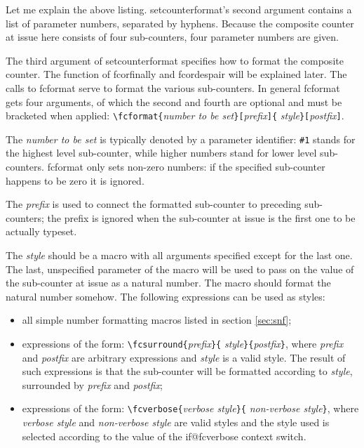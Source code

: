 \documentclass[11pt]{article}
\makeatletter
\def\macroname#1{{\ttfamily\@ttbs#1}}  %
\def\={\verb=}
\def\<#1>{\macroname{#1}}
\def\:{\linebreak[1]}
\makeatother
\begin{document}
Let me explain the above listing. \<setcounterformat>'s second argument
contains a list of parameter numbers, separated by hyphens. Because
the composite counter at issue here consists of four sub-counters, four
parameter numbers are given.

The third argument of \<setcounterformat> specifies how to format the
composite counter. The function of \<fcorfinally> and \<fcordespair>
will be explained later. The calls to \<fcformat> serve to format
the various sub-counters. In general \<fcformat> gets four arguments,
of which the second and fourth are optional and must be bracketed when
applied: \=\fcformat=\:\={=\textit{number to be set}\=}[=\textit{prefix}\=]{=%
\textit{style}\=}[=\textit{postfix}\=]=.

The \textit{number to be set} is typically denoted by a parameter identifier:
\=#1= stands for the highest level sub-counter, while higher numbers stand
for lower level sub-counters. \<fcformat> only sets non-zero numbers: if
the specified sub-counter happens to be zero it is ignored.

The \textit{prefix} is used to connect the formatted sub-counter to preceding
sub-counters; the prefix is ignored when the sub-counter at issue is the
first one to be actually typeset.

The \textit{style} should be a macro with all arguments specified except
for the last one. The last, unspecified parameter of the macro will be
used to pass on the value of the sub-counter at issue as a natural number.
The macro should format the natural number somehow. The following expressions
can be used as styles:\begin{itemize}
\item all simple number formatting macros listed in section \ref{sec:snf};
\item expressions of the form: \=\fcsurround=\:\={=\textit{prefix}\=}{=%
      \textit{style}\=}{=\textit{postfix}\=}=, where \textit{prefix} and
      \textit{postfix} are arbitrary expressions and \textit{style} is
      a valid style. The result of such expressions is that
      the sub-counter will be formatted according to \textit{style},
      surrounded by \textit{prefix} and \textit{postfix};
\item expressions of the form: \=\fcverbose=\:\={=\textit{verbose style}\=}{=%
      \textit{non-verbose style}\=}=, where \textit{verbose style} and
      \textit{non-verbose style} are valid styles and the style used is
      selected according to the value of the \<if@fcverbose> context switch.
\end{itemize}
\end{document}
